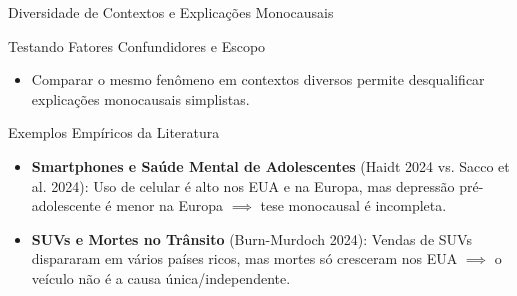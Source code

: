 \documentclass[
  ignorenonframetext,
  aspectratio=169,
  brazilian,
  t,
  10pt]{beamer}
\providecommand{\tightlist}{%
  \setlength{\itemsep}{0pt}\setlength{\parskip}{0pt}}
\begin{document}
\begin{frame}{Diversidade de Contextos e Explicações Monocausais}
\protect{}\label{diversidade-de-contextos-e-explicauxe7uxf5es-monocausais}
\begin{block}{Testando Fatores Confundidores e Escopo}
\protect{}\label{testando-fatores-confundidores-e-escopo}
\begin{itemize}
\tightlist
\item
  Comparar o mesmo fenômeno em contextos diversos permite desqualificar
  explicações monocausais simplistas.
\end{itemize}

\begin{exampleblock}{Exemplos Empíricos da Literatura}
\begin{itemize}
  \item \textbf{Smartphones e Saúde Mental de Adolescentes} (Haidt 2024 vs. Sacco et al. 2024): Uso de celular é alto nos EUA e na Europa, mas depressão pré-adolescente é menor na Europa $\implies$ tese monocausal é incompleta.
  \item \textbf{SUVs e Mortes no Trânsito} (Burn-Murdoch 2024): Vendas de SUVs dispararam em vários países ricos, mas mortes só cresceram nos EUA $\implies$ o veículo não é a causa única/independente.
\end{itemize}
\end{exampleblock}
\end{block}
\end{frame}
\end{document}
